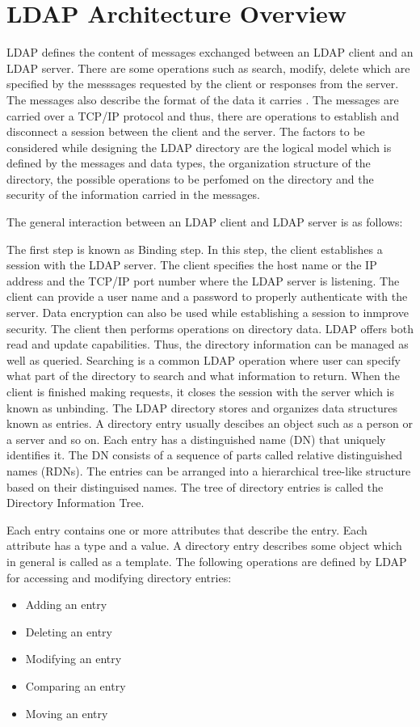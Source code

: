 \documentclass[9pt,twocolumn,twoside]{styles/osajnl}
\begin{document}
\section{LDAP Architecture Overview}
LDAP defines the content of messages exchanged between an LDAP client
and an LDAP server. There are some operations such as search, modify,
delete which are specified by the messsages requested by the client or
responses from the server.  The messages also describe the format of
the data it carries \cite{www-directory-organization}. The messages
are carried over a TCP/IP protocol and thus, there are operations to
establish and disconnect a session between the client and the server.
The factors to be considered while designing the LDAP directory are
the logical model which is defined by the messages and data types, the
organization structure of the directory, the possible operations to be
perfomed on the directory and the security of the information carried
in the messages.\cite{www-ldap-wikipedia}

The general interaction between an LDAP client and LDAP server is as
follows:

The first step is known as Binding step. In this step, the client
establishes a session with the LDAP server. The client specifies the
host name or the IP address and the TCP/IP port number where the LDAP
server is listening. The client can provide a user name and a password
to properly authenticate with the server. Data encryption can also be
used while establishing a session to inmprove security.  The client
then performs operations on directory data. LDAP offers both read and
update capabilities. Thus, the directory information can be managed as
well as queried. Searching is a common LDAP operation where user can
specify what part of the directory to search and what information to
return.  When the client is finished making requests, it closes the
session with the server which is known as unbinding.  The LDAP
directory stores and organizes data structures known as entries.  A
directory entry usually descibes an object such as a person or a
server and so on. Each entry has a distinguished name (DN) that
uniquely identifies it. The DN consists of a sequence of parts called
relative distinguished names (RDNs). The entries can be arranged into
a hierarchical tree-like structure based on their distinguised
names. The tree of directory entries is called the Directory
Information Tree. \cite{ldap-ibm-book}

Each entry contains one or more attributes that describe the
entry. Each attribute has a type and a value. A directory entry
describes some object which in general is called as a template.
The following operations are defined by LDAP for accessing and modifying
directory entries:
\begin{itemize}
\item Adding an entry
\item Deleting an entry
\item Modifying an entry
\item Comparing an entry
\item Moving an entry
\end{itemize}
\end{document}
